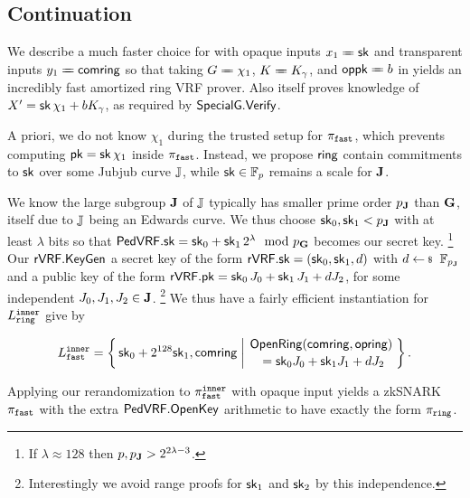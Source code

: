 \subsection{Continuation}
\label{subsec:rvrf_faster}


\def\longeq{=\mathrel{\mkern-10mu}=}%
We describe a much faster choice \pifast for \piring with
opaque inputs $x_1 \longeq \sk$ and transparent inputs $y_1 \longeq \comring$
 so that taking
 $\genG \longeq \chi_1$, $\genB \longeq \genB_\gamma$, and $\openpk \longeq b$
in \PedVRF yields an incredibly fast amortized ring VRF prover.
Also \PedVRF itself proves knowledge of $X' =  \mathsf{sk}\, \chi_1 + b K_\gamma $,
 as required by ${\mathsf{SpecialG}}.{\mathsf{Verify}}$.

A priori, we do not know $\chi_1$ during the trusted setup for $\pi_{\mathtt{fast}}$,
which prevents computing $\mathsf{pk} = \mathsf{sk}\, \chi_1$ inside $\pi_{\mathtt{fast}}$.
Instead, we propose $\mathsf{ring}$ contain commitments to $\mathsf{sk}$ over
some Jubjub curve ${\mathbb{J}}$, while $\mathsf{sk} \in \mathbb{F}_p$ remains a scale for ${\mathbf{J}}$.

We know the large subgroup ${\mathbf{J}}$ of ${\mathbb{J}}$ typically has smaller prime
order $p_{\mathbf{J}}$ than ${\mathbf{G}}$, itself due to ${\mathbb{J}}$ being an Edwards curve.
%
We thus choose $\mathsf{sk}_0,\mathsf{sk}_1 < p_{\mathbf{J}}$ with at least $\lambda$ bits
so that
 ${\mathsf{PedVRF}}.\mathsf{sk} = \mathsf{sk}_0 + \mathsf{sk}_1 \, 2^{\lambda} \mod p_{\mathbf{G}}$
becomes our secret key.
\footnote{If $\lambda \approx 128$ then $p, p_{\mathbf{J}} > 2^{2\lambda-3}$.}
Our ${\mathsf{rVRF}}.{\mathsf{KeyGen}}$ 
a secret key of the form ${\mathsf{rVRF}}.\mathsf{sk} = (\mathsf{sk}_0,\mathsf{sk}_1,d)$
 with $d \leftsample \F_{p_\grJ}$ and
a public key of the form
 ${\mathsf{rVRF}}.\mathsf{pk} = \mathsf{sk}_0\, J_0 + \mathsf{sk}_1\, J_1 + d J_2$,
for some independent $J_0,J_1,J_2 \in {\mathbf{J}}$. %
\footnote{Interestingly we avoid range proofs for $\mathsf{sk}_1$ and $\mathsf{sk}_2$ by this independence.}
We thus have a fairly efficient instantiation for $L_{\mathtt{ring}}^{\mathtt{inner}}$ give by

$$ \Lfast^\inner = \Setst{ \sk_0 + 2^{128} \sk_1, \comring }{
 \eprint{ \exists d,\openring \textrm{\ s.t.\ } }{}
 \genfrac{}{}{0pt}{}{ \eprint{\rVRF.}{}\OpenRing(\comring,\openring) }{ \,\, = \sk_0 \genJ_0 + \sk_1 \genJ_1 + d \genJ_2 }
} \mathperiod $$

Applying our rerandomization \Reprove to $\pi_{\mathtt{fast}}^{\mathtt{inner}}$ with opaque input
yields a zkSNARK $\pi_{\mathtt{fast}}$ with the extra ${\mathsf{PedVRF}}.{\mathsf{OpenKey}}$ arithmetic to
have exactly the form $\pi_{\mathtt{ring}}$.

